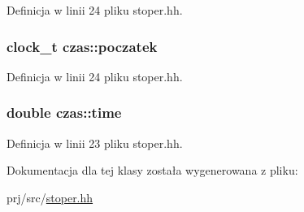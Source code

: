 \-Definicja w linii 24 pliku stoper.\-hh.

\hypertarget{classczas_a3e75d47bf9beee497b56997b0b7be45c}{
\subsubsection[{poczatek}]{\setlength{\rightskip}{0pt plus 5cm}clock\-\_\-t {\bf czas\-::poczatek}}}\label{classczas_a3e75d47bf9beee497b56997b0b7be45c}


\-Definicja w linii 24 pliku stoper.\-hh.

\hypertarget{classczas_a1348fd4948270410b3087bb0318bd147}{
\subsubsection[{time}]{\setlength{\rightskip}{0pt plus 5cm}double {\bf czas\-::time}}}\label{classczas_a1348fd4948270410b3087bb0318bd147}


\-Definicja w linii 23 pliku stoper.\-hh.



\-Dokumentacja dla tej klasy została wygenerowana z pliku\-:\begin{DoxyCompactItemize}
\item 
prj/src/\hyperlink{stoper_8hh}{stoper.\-hh}\end{DoxyCompactItemize}
